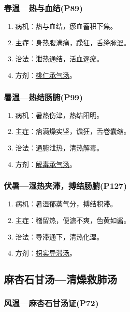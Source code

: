 \documentclass[cn,black,12pt,founder,normal,twocolumn]{elegantnote}
\begin{document}
\subsubsection{春温—热与血结(P89)}

\begin{enumerate}
    \item 病机：热与血结，瘀血蓄积下焦。
    \item 主症：身热腹满痛，躁狂，舌绛脉涩。
    \item 治法：泄热通结，活血逐瘀。
    \item 方剂：\uline{桃仁承气汤}。
\end{enumerate}

\subsubsection{暑温—热结肠腑(P99)}

\begin{enumerate}
    \item 病机：暑热伤津，热结阳明。
    \item 主症：痞满燥实坚，谵狂，舌卷囊缩。
    \item 治法：通腑泄热，清热解毒。
    \item 方剂：\uline{解毒承气汤}。
\end{enumerate}

\subsubsection{伏暑—湿热夹滞，搏结肠腑(P127)}

\begin{enumerate}
    \item 病机：暑湿郁蒸气分，搏结积滞。
    \item 主症：稽留热，便溏不爽，色黄如酱。
    \item 治法：导滞通下，清热化湿。
    \item 方剂：\uline{枳实导滞汤}。
\end{enumerate}

\subsection{麻杏石甘汤—清燥救肺汤}

\subsubsection{风温—麻杏石甘汤证(P72)}
\end{document}
